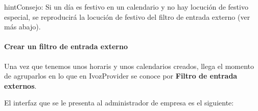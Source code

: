 \documentclass[letterpaper,10pt,spanish]{sphinxmanual}
\begin{document}
\begin{notice}{hint}{Consejo:}
Si un día es festivo en un calendario y no hay locución de festivo especial, se reproducirá la locución de festivo del filtro de entrada externo (ver más abajo).
\end{notice}
\paragraph{Crear un filtro de entrada externo}

Una vez que tenemos unos horaris y unos calendarios creados, llega el momento de agruparlos en lo que en IvozProvider se conoce por \textbf{Filtro de entrada externos}.

El interfaz que se le presenta al administrador de empresa es el siguiente:

\noindent{}
\end{document}
